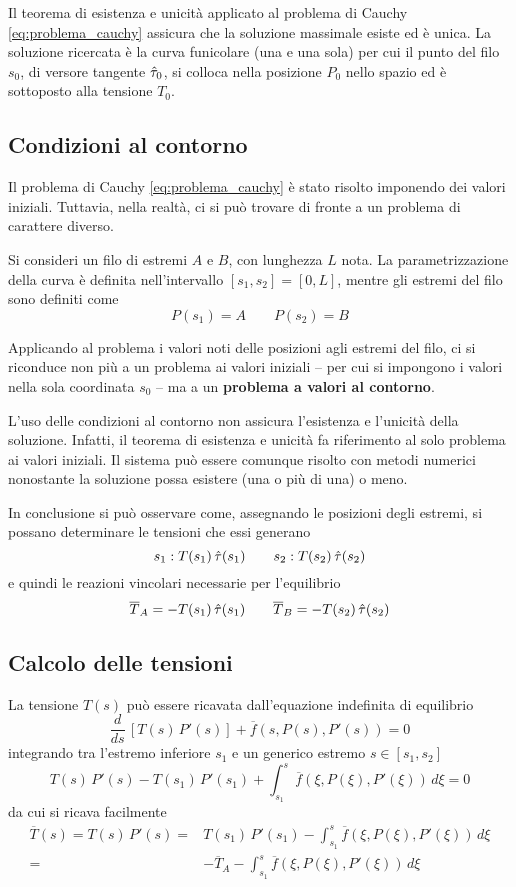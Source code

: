 Il teorema di esistenza e unicità applicato al problema di Cauchy \eqref{eq:problema_cauchy} assicura che la soluzione massimale esiste ed è unica.
La soluzione ricercata è la curva funicolare (una e una sola) per cui il punto del filo $s_0$, di versore tangente $\hat{\tau}_0$, si colloca nella posizione $P_0$ nello spazio ed è sottoposto alla tensione $T_0$.

\subsection{Condizioni al contorno}\label{section:condizioni_contorno}
Il problema di Cauchy \eqref{eq:problema_cauchy} è stato risolto imponendo dei valori iniziali. Tuttavia, nella realtà, ci si può trovare di fronte a un problema di carattere diverso.

Si consideri un filo di estremi $A$ e $B$, con lunghezza $L$ nota. La parametrizzazione della curva è definita nell'intervallo $[s_1, s_2] = [0, L]$, mentre gli estremi del filo sono definiti come
\[
P(s_1)	= A \qquad P(s_2)=B
\]

Applicando al problema i valori noti delle posizioni agli estremi del filo, ci si riconduce non più a un problema ai valori iniziali -- per cui si impongono i valori nella sola coordinata $s_0$ -- ma a un \textbf{problema a valori al contorno}.

L'uso delle condizioni al contorno non assicura l'esistenza e l'unicità della soluzione. Infatti, il teorema di esistenza e unicità fa riferimento al solo problema ai valori iniziali. Il sistema può essere comunque risolto con metodi numerici nonostante la soluzione possa esistere (una o più di una) o meno.

In conclusione si può osservare come, assegnando le posizioni degli estremi, si possano determinare le tensioni che essi generano
\[
s_1: T(s_1)\,\hat{\tau}(s_1)\qquad s_2: T(s_2)\,\hat{\tau}(s_2)
\]
e quindi le reazioni vincolari necessarie per l'equilibrio
\[
\overline{T}_A = -	T(s_1)\,\hat{\tau}(s_1)\qquad \overline{T}_B = -T(s_2)\,\hat{\tau}(s_2)
\]

\subsection{Calcolo delle tensioni}
La tensione $T(s)$ può essere ricavata dall'equazione indefinita di equilibrio 
\[
\dfrac{d}{ds}\,\left[T(s)\,P'(s)\right] + \overline{f}(s, P(s), P'(s)) = 0
\] 
integrando tra l'estremo inferiore $s_1$ e un generico estremo $s \in [s_1, s_2]$
\[
T(s)\,P'(s) - T(s_1)\,P'(s_1) + \int_{s_1}^s \overline{f}(\xi, P(\xi), P'(\xi))\,d\xi = 0
\]
da cui si ricava facilmente
\begin{align*}
\overline{T}	(s) = T(s)\,P'(s) =& T(s_1)\,P'(s_1) - \int_{s_1}^s \overline{f}(\xi, P(\xi), P'(\xi))\,d\xi\\
=& - \overline{T}_A - \int_{s_1}^s \overline{f}(\xi, P(\xi), P'(\xi))\,d\xi 
\end{align*}



